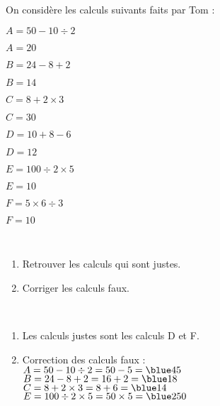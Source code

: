 \begin{exercice} %
   On considère les calculs suivants faits par Tom :
   \setlength{\columnseprule}{0pt}
   \begin{multicols}{2}
      \begin{list}{}{}
         \item $A=50-10\div2$
         \item $A=20$
         
         \smallskip         
         \item $B=24-8+2$
         \item $B=14$

         \smallskip
         \item $C=8+2\times3$
         \item $C=30$
         \columnbreak
         \item $D=10+8-6$
         \item $D=12$
         
         \smallskip
         \item $E=100\div2\times5$
         \item $E=10$
         
         \smallskip
         \item $F=5\times6\div3$
         \item $F=10$
      \end{list}
   \end{multicols}
   \  \\ [-10mm]
   \begin{enumerate}
      \item Retrouver les calculs qui sont justes.
      \item Corriger les calculs faux.
   \end{enumerate}
\end{exercice}

\begin{corrige}
   \ \\ [-5mm]
   \begin{enumerate}
      \item Les calculs justes sont les calculs {\blue D} et {\blue F}. \smallskip
      \item Correction des calculs faux : \\
         $A=50-10\div2 =50-5 ={\blue 45}$ \\ [1mm]
         $B=24-8+2 =16+2 ={\blue 18}$ \\ [1mm]
         $C=8+2\times3 =8+6 ={\blue 14}$ \\ [1mm]
         $E=100\div2\times5 =50\times5 = {\blue 250}$
   \end{enumerate}
\end{corrige}